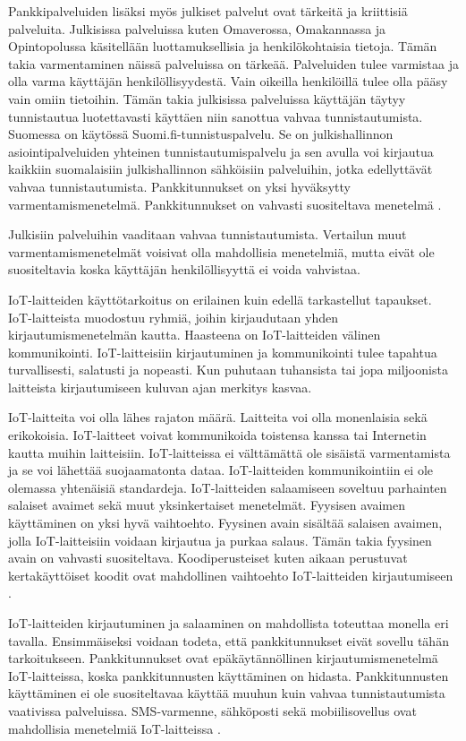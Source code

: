 Pankkipalveluiden lisäksi myös julkiset palvelut ovat tärkeitä ja kriittisiä palveluita. Julkisissa palveluissa kuten Omaverossa, Omakannassa ja Opintopolussa käsitellään luottamuksellisia ja henkilökohtaisia tietoja. Tämän takia varmentaminen näissä palveluissa on tärkeää. Palveluiden tulee varmistaa ja olla varma käyttäjän henkilöllisyydestä. Vain oikeilla henkilöillä tulee olla pääsy vain omiin tietoihin. Tämän takia julkisissa palveluissa käyttäjän täytyy tunnistautua luotettavasti käyttäen niin sanottua vahvaa tunnistautumista. Suomessa on käytössä Suomi.fi-tunnistuspalvelu. Se on julkishallinnon asiointipalveluiden yhteinen tunnistautumispalvelu ja sen avulla voi kirjautua kaikkiin suomalaisiin julkishallinnon sähköisiin palveluihin, jotka edellyttävät vahvaa tunnistautumista. Pankkitunnukset on yksi hyväksytty varmentamismenetelmä. Pankkitunnukset on vahvasti suositeltava menetelmä \citep{suomi.fi}.

Julkisiin palveluihin vaaditaan vahvaa tunnistautumista. Vertailun muut varmentamismenetelmät voisivat olla mahdollisia menetelmiä, mutta eivät ole suositeltavia koska käyttäjän henkilöllisyyttä ei voida vahvistaa.

IoT-laitteiden käyttötarkoitus on erilainen kuin edellä tarkastellut tapaukset. IoT-laitteista muodostuu ryhmiä, joihin kirjaudutaan yhden kirjautumismenetelmän kautta. Haasteena on IoT-laitteiden välinen kommunikointi. IoT-laitteisiin kirjautuminen ja kommunikointi tulee tapahtua turvallisesti, salatusti ja nopeasti. Kun puhutaan tuhansista tai jopa miljoonista laitteista kirjautumiseen kuluvan ajan merkitys kasvaa.

IoT-laitteita voi olla lähes rajaton määrä. Laitteita voi olla monenlaisia sekä erikokoisia. IoT-laitteet voivat kommunikoida toistensa kanssa tai Internetin kautta muihin laitteisiin. IoT-laitteissa ei välttämättä ole sisäistä varmentamista ja se voi lähettää suojaamatonta dataa. IoT-laitteiden kommunikointiin ei ole olemassa yhtenäisiä standardeja. IoT-laitteiden salaamiseen soveltuu parhainten salaiset avaimet sekä muut yksinkertaiset menetelmät. Fyysisen avaimen käyttäminen on yksi hyvä vaihtoehto. Fyysinen avain sisältää salaisen avaimen, jolla IoT-laitteisiin voidaan kirjautua ja purkaa salaus. Tämän takia fyysinen avain on vahvasti suositeltava. Koodiperusteiset kuten aikaan perustuvat kertakäyttöiset koodit ovat mahdollinen vaihtoehto IoT-laitteiden kirjautumiseen \citep{el2019survey} \citep{lucia2019device}.

IoT-laitteiden kirjautuminen ja salaaminen on mahdollista toteuttaa monella eri tavalla. Ensimmäiseksi voidaan todeta, että pankkitunnukset eivät sovellu tähän tarkoitukseen. Pankkitunnukset ovat epäkäytännöllinen kirjautumismenetelmä IoT-laitteissa, koska pankkitunnusten käyttäminen on hidasta. Pankkitunnusten käyttäminen ei ole suositeltavaa käyttää muuhun kuin vahvaa tunnistautumista vaativissa palveluissa. SMS-varmenne, sähköposti sekä mobiilisovellus ovat mahdollisia menetelmiä IoT-laitteissa \citep{el2019survey} \citep{lucia2019device}.

